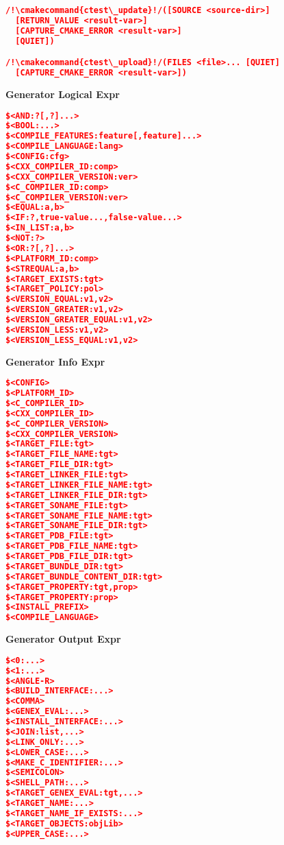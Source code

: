 \documentclass{article}
\newcommand{\cmakecommand}[1]{{\href{https://cmake.org/cmake/help/v3.13/command/#1.html}{#1}}}
\begin{document}
\begin{minipage}[t]{0.18\linewidth}
\begin{lstlisting}[language=CMake]
/!\cmakecommand{ctest\_update}!/([SOURCE <source-dir>]
  [RETURN_VALUE <result-var>]
  [CAPTURE_CMAKE_ERROR <result-var>]
  [QUIET])

/!\cmakecommand{ctest\_upload}!/(FILES <file>... [QUIET]
  [CAPTURE_CMAKE_ERROR <result-var>])
\end{lstlisting}

\textbf{Generator Logical Expr}
\begin{lstlisting}[language=CMake]
$<AND:?[,?]...>
$<BOOL:...>
$<COMPILE_FEATURES:feature[,feature]...>
$<COMPILE_LANGUAGE:lang>
$<CONFIG:cfg>
$<CXX_COMPILER_ID:comp>
$<CXX_COMPILER_VERSION:ver>
$<C_COMPILER_ID:comp>
$<C_COMPILER_VERSION:ver>
$<EQUAL:a,b>
$<IF:?,true-value...,false-value...>
$<IN_LIST:a,b>
$<NOT:?>
$<OR:?[,?]...>
$<PLATFORM_ID:comp>
$<STREQUAL:a,b>
$<TARGET_EXISTS:tgt>
$<TARGET_POLICY:pol>
$<VERSION_EQUAL:v1,v2>
$<VERSION_GREATER:v1,v2>
$<VERSION_GREATER_EQUAL:v1,v2>
$<VERSION_LESS:v1,v2>
$<VERSION_LESS_EQUAL:v1,v2>
\end{lstlisting}

\textbf{Generator Info Expr}
\begin{lstlisting}[language=CMake]
$<CONFIG>
$<PLATFORM_ID>
$<C_COMPILER_ID>
$<CXX_COMPILER_ID>
$<C_COMPILER_VERSION>
$<CXX_COMPILER_VERSION>
$<TARGET_FILE:tgt>
$<TARGET_FILE_NAME:tgt>
$<TARGET_FILE_DIR:tgt>
$<TARGET_LINKER_FILE:tgt>
$<TARGET_LINKER_FILE_NAME:tgt>
$<TARGET_LINKER_FILE_DIR:tgt>
$<TARGET_SONAME_FILE:tgt>
$<TARGET_SONAME_FILE_NAME:tgt>
$<TARGET_SONAME_FILE_DIR:tgt>
$<TARGET_PDB_FILE:tgt>
$<TARGET_PDB_FILE_NAME:tgt>
$<TARGET_PDB_FILE_DIR:tgt>
$<TARGET_BUNDLE_DIR:tgt>
$<TARGET_BUNDLE_CONTENT_DIR:tgt>
$<TARGET_PROPERTY:tgt,prop>
$<TARGET_PROPERTY:prop>
$<INSTALL_PREFIX>
$<COMPILE_LANGUAGE>
\end{lstlisting}

\textbf{Generator Output Expr}
\begin{lstlisting}[language=CMake]
$<0:...>
$<1:...>
$<ANGLE-R>
$<BUILD_INTERFACE:...>
$<COMMA>
$<GENEX_EVAL:...>
$<INSTALL_INTERFACE:...>
$<JOIN:list,...>
$<LINK_ONLY:...>
$<LOWER_CASE:...>
$<MAKE_C_IDENTIFIER:...>
$<SEMICOLON>
$<SHELL_PATH:...>
$<TARGET_GENEX_EVAL:tgt,...>
$<TARGET_NAME:...>
$<TARGET_NAME_IF_EXISTS:...>
$<TARGET_OBJECTS:objLib>
$<UPPER_CASE:...>
\end{lstlisting}
\end{minipage}
\hfill\vline\hfill
\end{document}

